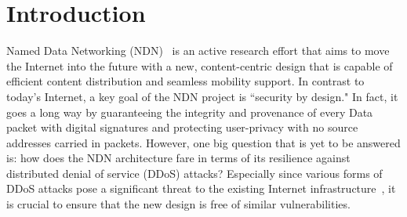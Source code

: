 \section{Introduction}
\label{sec:intro}





Named Data Networking (NDN)~\cite{ndn-conext, ndn-tr} is an active research effort that aims to move the Internet into the future with a new, content-centric design that is capable of efficient content distribution and seamless mobility support. 
In contrast to today's Internet, a key goal of the NDN project is ``security by design." In fact, it goes a long way by guaranteeing the integrity and provenance of every Data packet with digital signatures and protecting user-privacy with no source addresses carried in packets. However, one big question that is yet to be answered is: how does the NDN architecture fare in terms of its resilience against distributed denial of service (DDoS) attacks? Especially since various forms of DDoS attacks pose a significant threat to the existing Internet infrastructure~\cite{arbor-report}, it is crucial to ensure that the new design is free of similar vulnerabilities.

